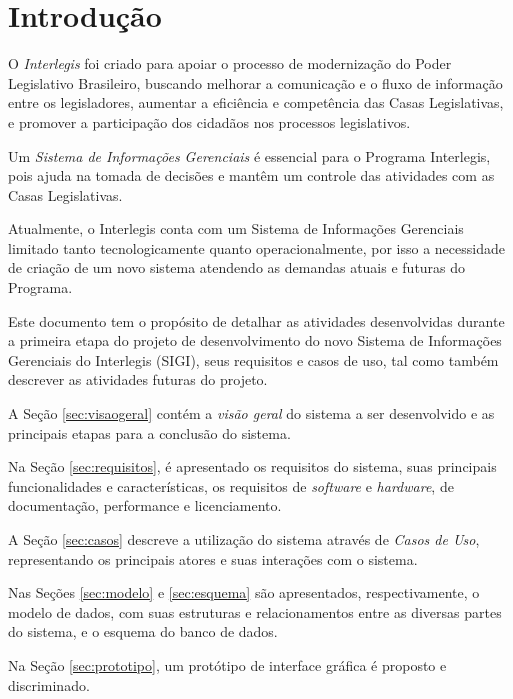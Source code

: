 %
%

\section{Introdução}
O \emph{Interlegis} foi criado para apoiar o processo de modernização
do Poder Legislativo Brasileiro, buscando melhorar a comunicação e o
fluxo de informação entre os legisladores, aumentar a eficiência e
competência das Casas Legislativas, e promover a participação dos
cidadãos nos processos legislativos.

Um \emph{Sistema de Informações Gerenciais} é essencial para o
Programa Interlegis, pois ajuda na tomada de decisões e mantêm um
controle das atividades com as Casas Legislativas.

Atualmente, o Interlegis conta com um Sistema de Informações
Gerenciais limitado tanto tecnologicamente quanto operacionalmente,
por isso a necessidade de criação de um novo sistema atendendo as
demandas atuais e futuras do Programa.

Este documento tem o propósito de detalhar as atividades desenvolvidas
durante a primeira etapa do projeto de desenvolvimento do novo Sistema
de Informações Gerenciais do Interlegis (SIGI), seus requisitos e
casos de uso, tal como também descrever as atividades futuras do
projeto.

A Seção \ref{sec:visaogeral} contém a \emph{visão geral} do sistema a
ser desenvolvido e as principais etapas para a conclusão do sistema.

Na Seção \ref{sec:requisitos}, é apresentado os requisitos do sistema,
suas principais funcionalidades e características, os requisitos de
\textit{software} e \textit{hardware}, de documentação, performance e
licenciamento.

A Seção \ref{sec:casos} descreve a utilização do sistema através de
\emph{Casos de Uso}, representando os principais atores e suas
interações com o sistema.

Nas Seções \ref{sec:modelo} e \ref{sec:esquema} são apresentados,
respectivamente, o modelo de dados, com suas estruturas e
relacionamentos entre as diversas partes do sistema, e o esquema do
banco de dados.

Na Seção \ref{sec:prototipo}, um protótipo de interface gráfica é
proposto e discriminado.

